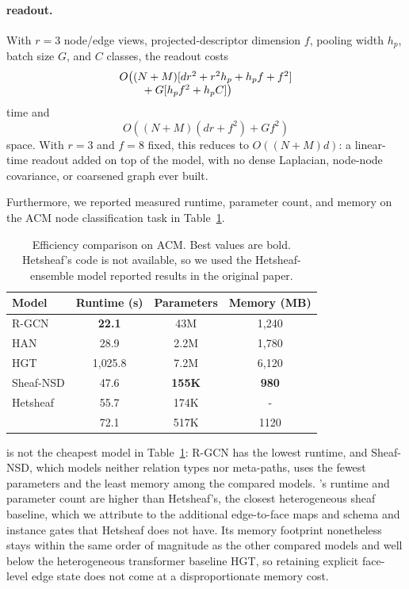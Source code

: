 \paragraph{\sheafcovpool{} readout.} With $r=3$ node/edge views, projected-descriptor
dimension $f$, pooling width $h_p$, batch size $G$, and $C$ classes, the readout costs
\[
\begin{array}{@{}l@{}}
O\bigl((N+M)[dr^2+r^2h_p+h_pf+f^2] \\
\qquad{}+G[h_pf^2+h_pC]\bigr)
\end{array}
\]
time and
\[
O\!\left((N+M)(dr+f^2)+Gf^2\right)
\]
space. With $r=3$ and $f=8$ fixed, this reduces to $O((N+M)d)$: a linear-time readout
added on top of the model, with no dense Laplacian, node-node covariance, or coarsened graph
ever built.

Furthermore, we reported measured runtime, parameter count, and memory on the ACM node
classification task in Table~\ref{tab:efficiency}.

\begin{table}[H]
  \centering
  \caption{Efficiency comparison on ACM. Best values are bold. Hetsheaf's code is not available, so we used the Hetsheaf-ensemble model reported results in the original paper.}
  \label{tab:efficiency}
  \scriptsize
  \begin{tabular}{lccc}
    \toprule
    \textbf{Model} & Runtime (s) & Parameters & Memory (MB) \\
    \midrule
    R-GCN & \textbf{22.1} & 43M & 1{,}240 \\
    HAN & 28.9 & 2.2M & 1{,}780 \\
    HGT & 1{,}025.8 & 7.2M & 6{,}120 \\
    Sheaf-NSD & 47.6 & \textbf{155K} & \textbf{980} \\
    Hetsheaf & 55.7 & 174K & - \\
    \midrule
    \textbf{\method{}} & 72.1 & 517K & 1120 \\
    \bottomrule
  \end{tabular}
\end{table}

\method{} is not the cheapest model in Table~\ref{tab:efficiency}: R-GCN has the lowest runtime,
and Sheaf-NSD, which models neither relation types nor meta-paths, uses the fewest parameters and
the least memory among the compared models. \method{}'s runtime and parameter count are higher
than Hetsheaf's, the closest heterogeneous sheaf baseline, which we attribute to the additional
edge-to-face maps and \ampss{} schema and instance gates that Hetsheaf does not have. Its memory
footprint nonetheless stays within the same order of magnitude as the other compared models and
well below the heterogeneous transformer baseline HGT, so retaining explicit face-level edge state
does not come at a disproportionate memory cost.


